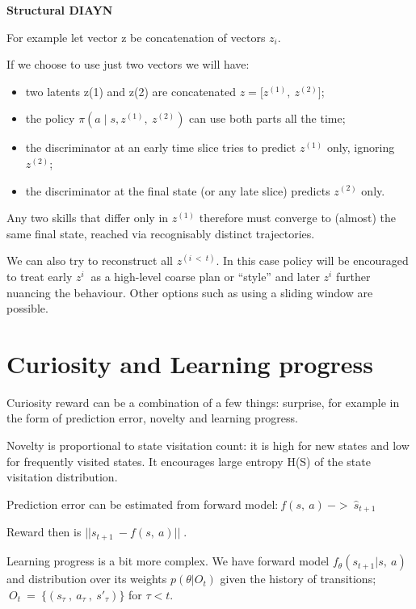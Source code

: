 \textbf{Structural DIAYN}\label{structural-diayn}

For example let vector z be concatenation of vectors $z_{i}$.

If we choose to use just two vectors we will have:

\begin{itemize}
\item
  two latents z(1) and z(2) are concatenated $z = \lbrack z^{(1)},\ z^{(2)}\rbrack$;
\end{itemize}

\begin{itemize}
\item
  the policy $\pi(a \mid s,z^{(1)},\ z^{(2)})$ can use both parts all the time;
\item
  the discriminator at an early time slice tries to predict $z^{(1)}$ only, ignoring $z^{(2)}$;
\item
  the discriminator at the final state (or any late slice) predicts $z^{(2)}$ only.
\end{itemize}

Any two skills that differ only in $z^{(1)}$ therefore must converge to (almost) the same final state, reached via recognisably distinct trajectories.

We can also try to reconstruct all $z^{(i\  < \ t)}$. In this case policy will be encouraged to treat early $z^{i}\ $ as a high-level coarse plan or ``style'' and later $z^{i}$ further nuancing the behaviour. Other options such as using a sliding window are possible.

\section{Curiosity and Learning progress}\label{curiosity-lp}

Curiosity reward can be a combination of a few things: surprise, for example in the form of prediction error, novelty and learning progress.

Novelty is proportional to state visitation count: it is high for new states and low for frequently visited states. 
It encourages large entropy H(S) of the state visitation distribution.

Prediction error can be estimated from forward model:$\ f(s,\ a)\  - > \ {\widehat{s}}_{t + 1}$

Reward then is $||s_{t + 1}\  - f(s,\ a)||_{}\ .$

Learning progress is a bit more complex. We have forward model $f_{\theta}(s_{t + 1}|s,\ a)$ and distribution over its weights $p(\theta|O_{t})$ given the history of transitions; $\ O_{t}\  = \ \{(s_{\tau}\ ,\ a_{\tau}\ ,\ s'_{\tau})\}$ for $\tau < t$.

